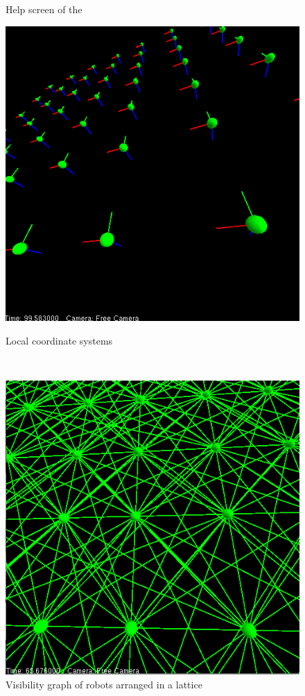 \begin{figure}[ht]
\begin{minipage}[t]{0.46\textwidth}
		\caption{Help screen of the \RSS}
		\label{WII:fig:help-screen}
	\end{minipage}
	\begin{minipage}[t]{0.46\textwidth}
		\centering
		\includegraphics[width=\textwidth]{chapter_whatitis_fig/local-coordinates.png}
		\caption{Local coordinate systems}
		\label{WII:fig:local-coordinates}
	\end{minipage}$\quad$
	\begin{minipage}[t]{0.46\textwidth}
		\centering
		\includegraphics[width=\textwidth]{chapter_whatitis_fig/visibility-graph.png}
		\caption{Visibility graph of robots arranged in a lattice}
		\label{WII:fig:visibility-graph}
	\end{minipage}
\end{figure}


